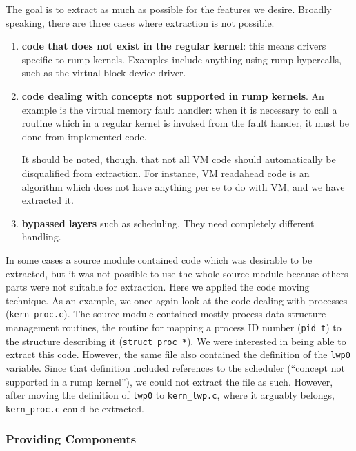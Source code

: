 The goal is to extract as much as possible for the features
we desire.  Broadly speaking, there are three cases where extraction
is not possible.

\begin{enumerate}
\item   \textbf{code that does not exist in the regular kernel}: this
	means drivers specific to rump kernels.  Examples include
	anything using rump hypercalls, such as the virtual
	block device driver.

\item	\textbf{code dealing with concepts not supported in
	rump kernels}.  An example is the virtual memory fault handler:
	when it is necessary to call a routine which in a regular
	kernel is invoked from the fault hander, it must be done from
	implemented code.

        It should be noted, though, that not all VM code should
        automatically be disqualified from extraction.  For instance,
        VM readahead code is an algorithm which does not have anything
        per se to do with VM, and we have extracted it.

\item   \textbf{bypassed layers} such as scheduling.  They need
	completely different handling.
\end{enumerate}

In some cases a source module contained code which was desirable to be
extracted, but it was not possible to use the whole source module
because others parts were not suitable for extraction.  Here we
applied the code moving technique.  As an example, we once again
look at the code dealing with processes (\verb+kern_proc.c+).
The source module contained mostly process data structure management routines,
\eg the routine for mapping a process ID number (\verb+pid_t+) to the structure
describing it (\texttt{struct~proc~*}).  We were interested in being
able to extract this code.  However, the same file also contained the
definition of the \texttt{lwp0} variable.  Since that definition
included references to the scheduler (``concept not supported in
a rump kernel''), we could not extract the file as such.  However,
after moving the definition of \texttt{lwp0} to \verb+kern_lwp.c+,
where it arguably belongs, \verb+kern_proc.c+ could be extracted.


\subsubsection{Providing Components}

